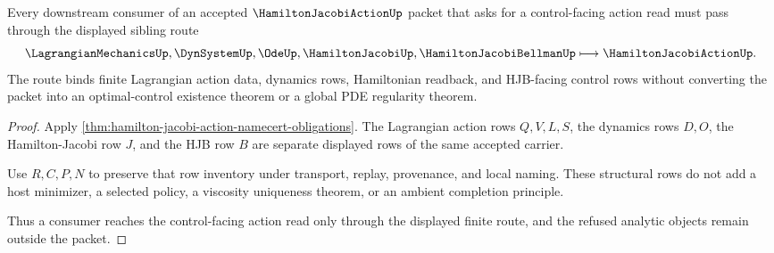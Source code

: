 \begin{theorem}
\label{thm:hamilton-jacobi-action-hjb-route}
Every downstream consumer of an accepted $\HamiltonJacobiActionUp$ packet that asks for a control-facing action read must pass through the displayed sibling route
$$
\LagrangianMechanicsUp,\DynSystemUp,\OdeUp,\HamiltonJacobiUp,\HamiltonJacobiBellmanUp \longmapsto \HamiltonJacobiActionUp .
$$
The route binds finite Lagrangian action data, dynamics rows, Hamiltonian readback, and HJB-facing control rows without converting the packet into an optimal-control existence theorem or a global PDE regularity theorem.
\end{theorem}
\begin{proof}
Apply \autoref{thm:hamilton-jacobi-action-namecert-obligations}. The Lagrangian action rows $Q,V,L,S$, the dynamics rows $D,O$, the Hamilton-Jacobi row $J$, and the HJB row $B$ are separate displayed rows of the same accepted carrier.

Use $R,C,P,N$ to preserve that row inventory under transport, replay, provenance, and local naming. These structural rows do not add a host minimizer, a selected policy, a viscosity uniqueness theorem, or an ambient completion principle.

Thus a consumer reaches the control-facing action read only through the displayed finite route, and the refused analytic objects remain outside the packet.
\end{proof}




